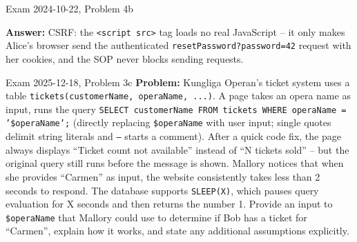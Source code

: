 \documentclass[12pt, a4paper]{article}
\begin{document}
\begin{practicebox}{Exam 2024-10-22, Problem 4b}
\begin{itemize}
\end{itemize}
\textbf{Answer:} CSRF: the \texttt{<script src>} tag loads no real JavaScript -- it only makes Alice's browser send the authenticated \texttt{resetPassword?password=42} request with her cookies, and the SOP never blocks sending requests.
\end{practicebox}

\begin{practicebox}{Exam 2025-12-18, Problem 3c}
\textbf{Problem:} Kungliga Operan's ticket system uses a table \texttt{tickets(customerName, operaName, ...)}. A page takes an opera name as input, runs the query \texttt{SELECT customerName FROM tickets WHERE operaName = '\$operaName';} (directly replacing \texttt{\$operaName} with user input; single quotes delimit string literals and \texttt{--} starts a comment). After a quick code fix, the page always displays ``Ticket count not available'' instead of ``N tickets sold'' -- but the original query still runs before the message is shown. Mallory notices that when she provides ``Carmen'' as input, the website consistently takes less than 2 seconds to respond. The database supports \texttt{SLEEP(X)}, which pauses query evaluation for X seconds and then returns the number 1. Provide an input to \texttt{\$operaName} that Mallory could use to determine if Bob has a ticket for ``Carmen'', explain how it works, and state any additional assumptions explicitly.


\end{practicebox}
\end{document}
